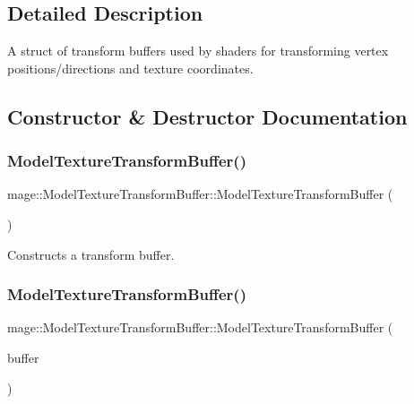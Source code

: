 \subsection{Detailed Description}
A struct of transform buffers used by shaders for transforming vertex positions/directions and texture coordinates. 

\subsection{Constructor \& Destructor Documentation}
\hypertarget{structmage_1_1_model_texture_transform_buffer_a500d8232f1350b0beccc2181951309d6}{}\label{structmage_1_1_model_texture_transform_buffer_a500d8232f1350b0beccc2181951309d6} 
\subsubsection{\texorpdfstring{Model\+Texture\+Transform\+Buffer()}{ModelTextureTransformBuffer()}\hspace{0.1cm}{\footnotesize\ttfamily [1/3]}}
{\footnotesize\ttfamily mage\+::\+Model\+Texture\+Transform\+Buffer\+::\+Model\+Texture\+Transform\+Buffer (\begin{DoxyParamCaption}{ }\end{DoxyParamCaption})}

Constructs a transform buffer. \hypertarget{structmage_1_1_model_texture_transform_buffer_a5b0c7030b2e48302e6c071935a4bc7d5}{}\label{structmage_1_1_model_texture_transform_buffer_a5b0c7030b2e48302e6c071935a4bc7d5} 
\subsubsection{\texorpdfstring{Model\+Texture\+Transform\+Buffer()}{ModelTextureTransformBuffer()}\hspace{0.1cm}{\footnotesize\ttfamily [2/3]}}
{\footnotesize\ttfamily mage\+::\+Model\+Texture\+Transform\+Buffer\+::\+Model\+Texture\+Transform\+Buffer (\begin{DoxyParamCaption}\item[{const \hyperlink{structmage_1_1_model_texture_transform_buffer}{Model\+Texture\+Transform\+Buffer} \&}]{buffer }\end{DoxyParamCaption})\hspace{0.3cm}{\ttfamily [default]}}

